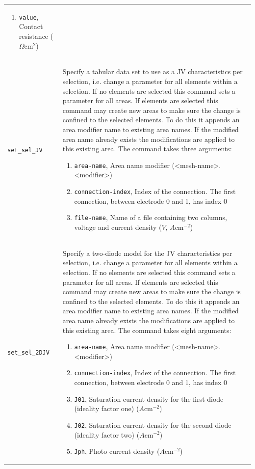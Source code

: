 \documentclass[noshowpacs,preprintnumbers,amsmath,amssymb, letter]{revtex4}
\begin{document}
\begin{longtable}{p{}p{}}
\begin{enumerate}
\item \texttt{value}, Contact resistance ($\Omega \text{cm}^2$)
\end{enumerate}\\
\texttt{set\_sel\_JV}	&  Specify a tabular data set to use as a JV characteristics per selection, i.e. change a parameter for all elements within a selection. If no elements are selected this command sets a parameter for all areas. If elements are selected this command may create new areas to make sure the change is confined to the selected elements. To do this it appends an area modifier name to existing area names. If the modified area name already exists the modifications are applied to this existing area. The command takes three arguments:
\begin{enumerate}
\item \texttt{area-name}, Area name modifier (\textless mesh-name\textgreater .\textless modifier\textgreater )
\item \texttt{connection-index}, Index of the connection. The first connection, between electrode 0 and 1,  has index 0
\item \texttt{file-name}, Name of a file containing two columns, voltage and current density ($V$, $A \text{cm}^{-2}$)
\end{enumerate}\\
\texttt{set\_sel\_2DJV}	&  Specify a two-diode model for the JV characteristics per selection, i.e. change a parameter for all elements within a selection. If no elements are selected this command sets a parameter for all areas. If elements are selected this command may create new areas to make sure the change is confined to the selected elements. To do this it appends an area modifier name to existing area names. If the modified area name already exists the modifications are applied to this existing area. The command takes eight arguments:
\begin{enumerate}
\item \texttt{area-name}, Area name modifier (\textless mesh-name\textgreater .\textless modifier\textgreater )
\item \texttt{connection-index}, Index of the connection. The first connection, between electrode 0 and 1,  has index 0
\item \texttt{J01}, Saturation current density for the first diode (ideality factor one)  ($A \text{cm}^{-2}$)
\item \texttt{J02}, Saturation current density for the second diode (ideality factor two)  ($A \text{cm}^{-2}$)
\item \texttt{Jph}, Photo current density ($A \text{cm}^{-2}$)

\end{enumerate}
\end{longtable}
\end{document}
